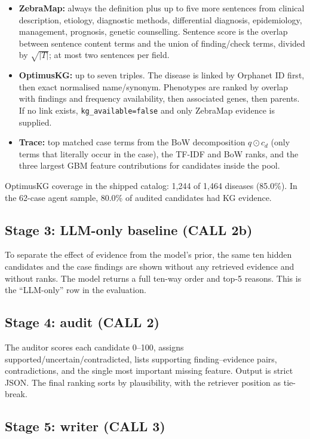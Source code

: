 \documentclass[11pt,a4paper]{article}
\newcommand{\code}[1]{\texttt{\small #1}}
\begin{document}
\begin{itemize}[leftmargin=1.4em]
\item \textbf{ZebraMap:} always the definition plus up to five more sentences from
clinical description, etiology, diagnostic methods, differential diagnosis,
epidemiology, management, prognosis, genetic counselling. Sentence score is the
overlap between sentence content terms and the union of finding/check terms,
divided by $\sqrt{|T|}$; at most two sentences per field.
\item \textbf{OptimusKG:} up to seven triples. The disease is linked by Orphanet ID
first, then exact normalised name/synonym. Phenotypes are ranked by overlap with
findings and frequency availability, then associated genes, then parents. If no link
exists, \code{kg\_available=false} and only ZebraMap evidence is supplied.
\item \textbf{Trace:} top matched case terms from the BoW decomposition
$q\odot c_d$ (only terms that literally occur in the case), the TF-IDF and BoW
ranks, and the three largest GBM feature contributions for candidates inside the
pool.
\end{itemize}

OptimusKG coverage in the shipped catalog: 1,244 of 1,464 diseases (85.0\%). In the
62-case agent sample, 80.0\% of audited candidates had KG evidence.

\subsection{Stage 3: LLM-only baseline (CALL 2b)}

To separate the effect of evidence from the model's prior, the same ten hidden
candidates and the case findings are shown without any retrieved evidence and
without ranks. The model returns a full ten-way order and top-5 reasons. This is
the ``LLM-only'' row in the evaluation.

\subsection{Stage 4: audit (CALL 2)}

The auditor scores each candidate 0--100, assigns supported/uncertain/contradicted,
lists supporting finding--evidence pairs, contradictions, and the single most
important missing feature. Output is strict JSON. The final ranking sorts by
plausibility, with the retriever position as tie-break.

\subsection{Stage 5: writer (CALL 3)}
\end{document}
